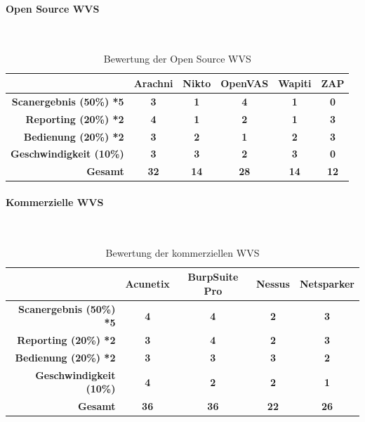 \documentclass[12pt,oneside,a4paper,parskip,pointlessnumbers]{scrbook}
\begin{document}
     \paragraph{Open Source WVS}
     \
       \begin{table}[H]
       \begin{tabular}{|r|c|c|c|c|c|}
       \hline
       \textbf{}            & \textbf{Arachni} & \textbf{Nikto} & \textbf{OpenVAS} & \textbf{Wapiti} & \textbf{ZAP}  \\
       \hline
       \textbf{Scanergebnis (50\%) *5}    & \textbf{3}      &  \textbf{1}      & \textbf{4}      &   \textbf{1}     &  \textbf{0}       \\
       \hline
       \textbf{Reporting (20\%) *2}       &  \textbf{4}     &  \textbf{1}      & \textbf{2}      &   \textbf{1}    &   \textbf{3}     \\
       \hline
       \textbf{Bedienung (20\%) *2}       & \textbf{3}       & \textbf{2}     & \textbf{1}       & \textbf{2}      & \textbf{3}        \\
       \hline
       \textbf{Geschwindigkeit (10\%)} & \textbf{3}       & \textbf{3}    & \textbf{2}       & \textbf{3}     & \textbf{0}          \\
       \hline
       \textbf{Gesamt}                 &   \textbf{32}     &  \textbf{14}   &  \textbf{28}      &  \textbf{14}    &  \textbf{12}          \\
       \hline
       \end{tabular}
       \caption[Bewertung der Open Source WVS]{Bewertung der Open Source WVS}
     \end{table}
     \paragraph{Kommerzielle WVS}
     \
       \begin{table}[H]
       \begin{tabular}{|r|c|c|c|c|}
       \hline
       \textbf{}       & \textbf{Acunetix} & \textbf{BurpSuite Pro} & \textbf{Nessus} & \textbf{Netsparker}  \\
       \hline
       \textbf{Scanergebnis (50\%) *5}    & \textbf{4}      &  \textbf{4}            & \textbf{2}      &   \textbf{3}         \\
       \hline
       \textbf{Reporting (20\%) *2}       &  \textbf{3}     &  \textbf{4}            & \textbf{2}      &   \textbf{3}         \\
       \hline
       \textbf{Bedienung (20\%) *2}       & \textbf{3}      & \textbf{3}           & \textbf{3}      & \textbf{2}        \\
       \hline
       \textbf{Geschwindigkeit (10\%)} & \textbf{4}       & \textbf{2}              & \textbf{2}      & \textbf{1}            \\
       \hline
       \textbf{Gesamt}                 &  \textbf{36}     & \textbf{36}              & \textbf{22}       &  \textbf{26}                    \\
       \hline
       \end{tabular}
       \caption[Bewertung der kommerziellen WVS]{Bewertung der kommerziellen WVS}
     \end{table}
\end{document}
